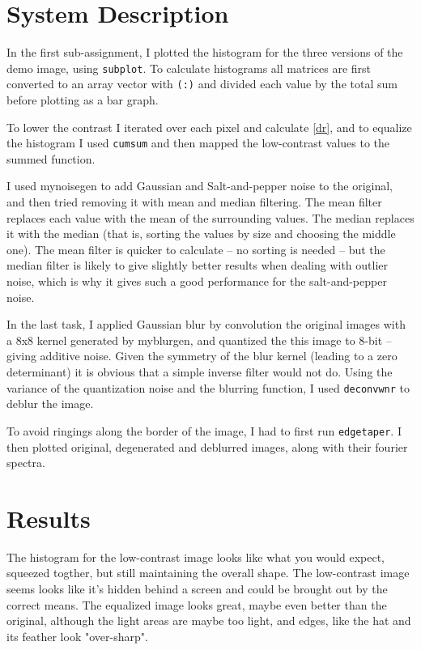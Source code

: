 \documentclass[a4paper]{article}
\begin{document}

\section{System Description}
\label{sec:system}
In the first sub-assignment, I plotted the histogram for the three versions of the demo image, using \texttt{subplot}. To calculate histograms all matrices are first converted to an array vector with \texttt{(:)} and divided each value by the total sum before plotting as a bar graph.

To lower the contrast I iterated over each pixel and calculate \eqref{dr}, and to equalize the histogram I used \texttt{cumsum} and then mapped the low-contrast values to the summed function.

I used mynoisegen to add Gaussian and Salt-and-pepper noise to the original, and then tried removing it with mean and median filtering. The mean filter replaces each value with the mean of the surrounding values. The median replaces it with the median (that is, sorting the values by size and choosing the middle one). The mean filter is quicker to calculate -- no sorting is needed -- but the median filter is likely to give slightly better results when dealing with outlier noise, which is why it gives such a good performance for the salt-and-pepper noise.

In the last task, I applied Gaussian blur by convolution the original images with a 8x8 kernel generated by myblurgen, and quantized the this image to 8-bit -- giving additive noise. Given the symmetry of the blur kernel (leading to a zero determinant) it is obvious that a simple inverse filter would not do. Using the variance of the quantization noise and the blurring function, I used \texttt{deconvwnr} to deblur the image.

To avoid ringings along the border of the image, I had to first run \texttt{edgetaper}. I then plotted original, degenerated and deblurred images, along with their fourier spectra.

\section{Results}
\label{sec:results}

The histogram for the low-contrast image looks like what you would expect, squeezed togther, but still maintaining the overall shape. The low-contrast image seems looks like it's hidden behind a screen and could be brought out by the correct means. The equalized image looks great, maybe even better than the original, although the light areas are maybe too light, and edges, like the hat and its feather look "over-sharp".
\end{document}
